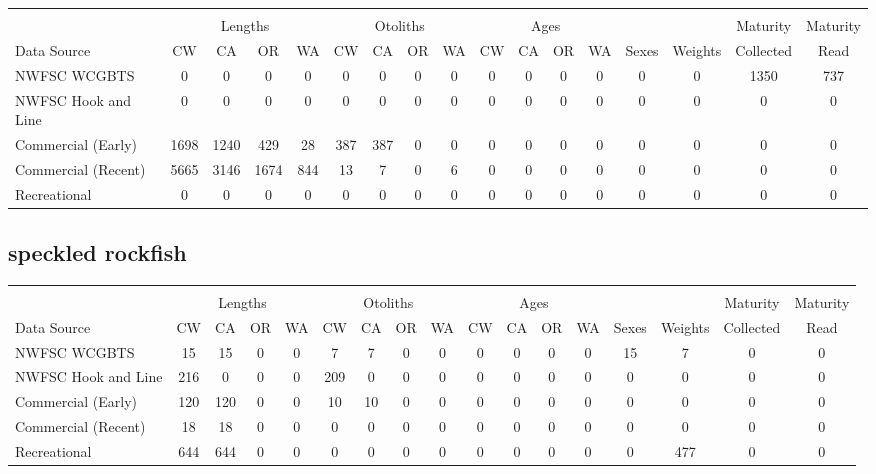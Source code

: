 \documentclass[12pt,]{article}
\begin{document}
\begin{table}[ht]
\centering
\begingroup\fontsize{10pt}{10pt}\selectfont
\begin{tabular}{|l|cccc|cccc|cccc|c|c|c|c|}
  \hline
 &  &  &  &  &  &  &  &  &  &  &  &  &  &  &  &  \\ 
   & \multicolumn{4}{c}{Lengths} &  \multicolumn{4}{c}{Otoliths} & \multicolumn{4}{c}{Ages} &  & & Maturity & Maturity\\
 Data Source & CW & CA & OR & WA & CW & CA & OR & WA & CW & CA & OR & WA & Sexes & Weights & Collected & Read\\
 \hline
NWFSC WCGBTS & 0 & 0 & 0 & 0 & 0 & 0 & 0 & 0 & 0 & 0 & 0 & 0 & 0 & 0 & 1350 & 737 \\ 
  NWFSC Hook and Line & 0 & 0 & 0 & 0 & 0 & 0 & 0 & 0 & 0 & 0 & 0 & 0 & 0 & 0 & 0 & 0 \\ 
  Commercial (Early) & 1698 & 1240 & 429 & 28 & 387 & 387 & 0 & 0 & 0 & 0 & 0 & 0 & 0 & 0 & 0 & 0 \\ 
  Commercial (Recent) & 5665 & 3146 & 1674 & 844 & 13 & 7 & 0 & 6 & 0 & 0 & 0 & 0 & 0 & 0 & 0 & 0 \\ 
  Recreational & 0 & 0 & 0 & 0 & 0 & 0 & 0 & 0 & 0 & 0 & 0 & 0 & 0 & 0 & 0 & 0 \\ 
   \hline
\end{tabular}
\endgroup
\end{table}

\FloatBarrier  

\newpage  

\subsection{speckled rockfish}\label{speckled-rockfish}

\begin{table}[ht]
\centering
\begingroup\fontsize{10pt}{10pt}\selectfont
\begin{tabular}{|l|cccc|cccc|cccc|c|c|c|c|}
  \hline
 &  &  &  &  &  &  &  &  &  &  &  &  &  &  &  &  \\ 
   & \multicolumn{4}{c}{Lengths} &  \multicolumn{4}{c}{Otoliths} & \multicolumn{4}{c}{Ages} &  & & Maturity & Maturity\\
 Data Source & CW & CA & OR & WA & CW & CA & OR & WA & CW & CA & OR & WA & Sexes & Weights & Collected & Read\\
 \hline
NWFSC WCGBTS & 15 & 15 & 0 & 0 & 7 & 7 & 0 & 0 & 0 & 0 & 0 & 0 & 15 & 7 & 0 & 0 \\ 
  NWFSC Hook and Line & 216 & 0 & 0 & 0 & 209 & 0 & 0 & 0 & 0 & 0 & 0 & 0 & 0 & 0 & 0 & 0 \\ 
  Commercial (Early) & 120 & 120 & 0 & 0 & 10 & 10 & 0 & 0 & 0 & 0 & 0 & 0 & 0 & 0 & 0 & 0 \\ 
  Commercial (Recent) & 18 & 18 & 0 & 0 & 0 & 0 & 0 & 0 & 0 & 0 & 0 & 0 & 0 & 0 & 0 & 0 \\ 
  Recreational & 644 & 644 & 0 & 0 & 0 & 0 & 0 & 0 & 0 & 0 & 0 & 0 & 0 & 477 & 0 & 0 \\ 
   \hline
\end{tabular}
\endgroup
\end{table}
\end{document}
